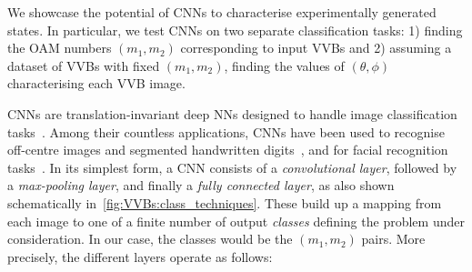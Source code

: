 We showcase the potential of \acp{CNN} to characterise experimentally generated states.
In particular, we test CNNs on two separate classification tasks:
1) finding the OAM numbers $(m_1,m_2)$ corresponding to input VVBs and 2) assuming a dataset of VVBs with fixed $(m_1,m_2)$, finding the values of $(\theta,\phi)$ characterising each VVB image.

\acp{CNN} are translation-invariant deep NNs designed to handle image classification tasks~\cite{lecun2015deep}. Among their countless applications, CNNs have been used to recognise off-centre images and segmented handwritten digits~\cite{simard2003best,ciresan2011flexible},
and for facial recognition tasks~\cite{matsugu2003subject}.
In its simplest form, a \ac{CNN} consists of a \emph{convolutional layer},
followed by a \emph{max-pooling layer}, and finally a \emph{fully connected layer}, as also shown schematically in~\cref{fig:VVBs:class_techniques}.
These build up a mapping from each image to one of a finite number of output \emph{classes} defining the problem under consideration. In our case, the classes would be the $(m_1,m_2)$ pairs.
More precisely, the different layers operate as follows:
